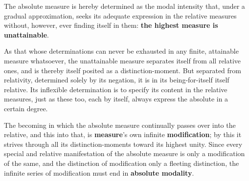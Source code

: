 \documentclass[12pt,a4paper,openany]{book}
\newcommand{\opage}[1]{\marginnote{\footnotesize\textit{[#1]}}}
\begin{document}
The absolute measure is hereby determined as the modal intensity that, under a gradual approximation, seeks its adequate expression in the relative measures without, however,
\setcounter{footnote}{0}%
\opage{77}ever finding itself in them: \textbf{the highest measure is} \textbf{unattainable}.

As that whose determinations can never be exhausted in any finite, attainable measure whatsoever, the unattainable measure separates itself from all relative ones, and is thereby itself posited as a distinction-moment. But separated from relativity, determined solely by its negation, it is in its being-for-itself itself relative. Its inflexible determination is to specify its content in the relative measures, just as these too, each by itself, always express the absolute in a certain degree.

The becoming in which the absolute measure continually passes over into the relative, and this into that, is \textbf{measure}'s own infinite \textbf{modification}; by this it strives through all its distinction-moments toward its highest unity. Since every special and relative manifestation of the absolute measure is only a modification of the same, and the distinction of modification only a fleeting distinction, the infinite series of modification must end in \textbf{absolute modality}.
\end{document}
